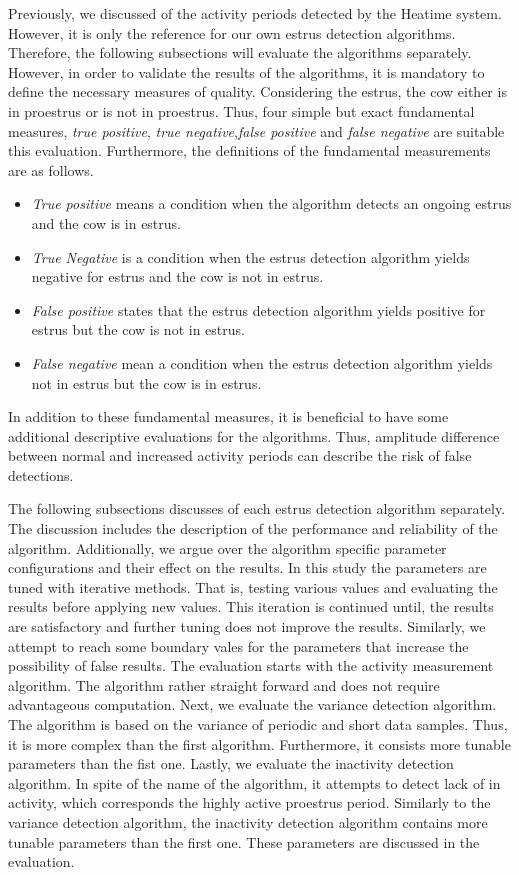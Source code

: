 \documentclass[english,12pt,a4paper,pdftex,elec,utf8]{aaltothesis}
\begin{document}
Previously, we discussed of the activity periods detected by the Heatime system. However, it is only the reference for our own estrus detection algorithms. Therefore, the following subsections will evaluate the algorithms separately. However, in order to validate the results of the algorithms, it is mandatory to define the necessary measures of quality. Considering the estrus, the cow either is in proestrus or is not in proestrus. Thus, four simple but exact fundamental measures, \textit{true positive}, \textit{true negative},\textit{false positive} and \textit{false negative} are suitable this evaluation. Furthermore, the definitions of the fundamental measurements are as follows.

\begin{itemize}
\item \textit{True positive} means a condition when the algorithm detects an ongoing estrus and the cow is in estrus.
\item \textit{True Negative} is a condition when the estrus detection algorithm yields negative for estrus and the cow is not in estrus.
\item \textit{False positive} states that the estrus detection algorithm yields positive for estrus but the cow is not in estrus.
\item \textit{False negative} mean a condition when the estrus detection algorithm yields not in estrus but the cow is in estrus.
\end{itemize}
In addition to these fundamental measures, it is beneficial to have some additional descriptive evaluations for the algorithms. Thus, amplitude difference between normal and increased activity periods can describe the risk of false detections. 


The following subsections discusses of each estrus detection algorithm separately. The discussion includes the description of the performance and reliability of the algorithm. Additionally, we argue over the algorithm specific parameter configurations and their effect on the results. In this study the parameters are tuned with iterative methods. That is, testing various values and evaluating the results before applying new values. This iteration is continued until, the results are satisfactory and further tuning does not improve the results. Similarly, we attempt to reach some boundary vales for the parameters that increase the possibility of false results. The evaluation starts with the activity measurement algorithm. The algorithm rather straight forward and does not require advantageous computation. Next, we  evaluate the variance detection algorithm. The algorithm is based on the variance of periodic and short data samples. Thus, it is more complex than the first algorithm. Furthermore, it consists more tunable parameters than the fist one. Lastly, we evaluate the inactivity detection algorithm. In spite of the name of the algorithm, it attempts to detect lack of in activity, which corresponds the highly active proestrus period. Similarly to the variance detection algorithm, the inactivity detection algorithm contains more tunable parameters than the first one. These parameters are discussed in the evaluation.
\end{document}
